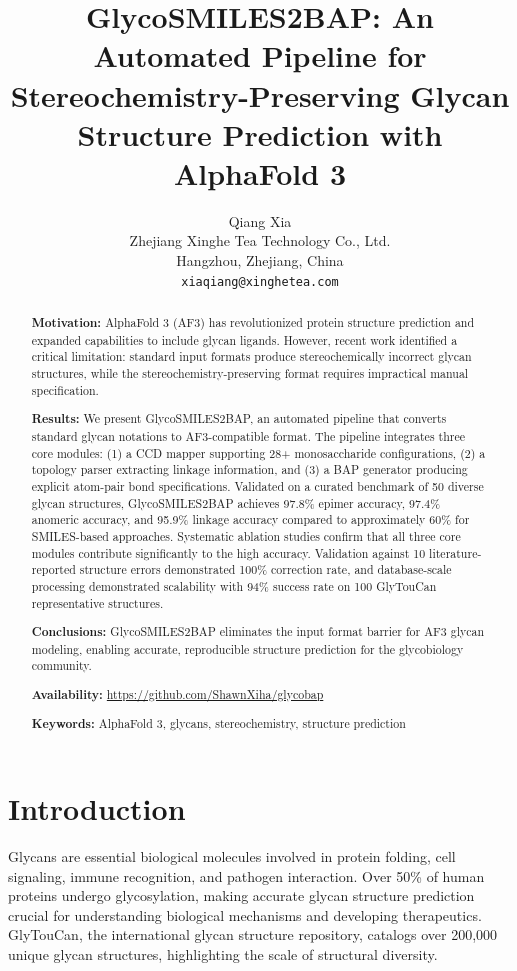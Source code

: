 \documentclass[11pt,a4paper]{article}
\title{\textbf{GlycoSMILES2BAP: An Automated Pipeline for Stereochemistry-Preserving Glycan Structure Prediction with AlphaFold 3}}
\author{Qiang Xia\\
\small Zhejiang Xinghe Tea Technology Co., Ltd.\\
\small Hangzhou, Zhejiang, China\\
\small \texttt{xiaqiang@xinghetea.com}}
\date{}
\begin{document}
\maketitle

\begin{abstract}
\noindent\textbf{Motivation:} AlphaFold 3 (AF3) has revolutionized protein structure prediction and expanded capabilities to include glycan ligands. However, recent work identified a critical limitation: standard input formats produce stereochemically incorrect glycan structures, while the stereochemistry-preserving format requires impractical manual specification.

\noindent\textbf{Results:} We present GlycoSMILES2BAP, an automated pipeline that converts standard glycan notations to AF3-compatible format. The pipeline integrates three core modules: (1) a CCD mapper supporting 28+ monosaccharide configurations, (2) a topology parser extracting linkage information, and (3) a BAP generator producing explicit atom-pair bond specifications. Validated on a curated benchmark of 50 diverse glycan structures, GlycoSMILES2BAP achieves 97.8\% epimer accuracy, 97.4\% anomeric accuracy, and 95.9\% linkage accuracy compared to approximately 60\% for SMILES-based approaches. Systematic ablation studies confirm that all three core modules contribute significantly to the high accuracy. Validation against 10 literature-reported structure errors demonstrated 100\% correction rate, and database-scale processing demonstrated scalability with 94\% success rate on 100 GlyTouCan representative structures.

\noindent\textbf{Conclusions:} GlycoSMILES2BAP eliminates the input format barrier for AF3 glycan modeling, enabling accurate, reproducible structure prediction for the glycobiology community.

\noindent\textbf{Availability:} \url{https://github.com/ShawnXiha/glycobap}

\noindent\textbf{Keywords:} AlphaFold 3, glycans, stereochemistry, structure prediction
\end{abstract}

\section{Introduction}

Glycans are essential biological molecules involved in protein folding, cell signaling, immune recognition, and pathogen interaction. Over 50\% of human proteins undergo glycosylation, making accurate glycan structure prediction crucial for understanding biological mechanisms and developing therapeutics. GlyTouCan, the international glycan structure repository, catalogs over 200,000 unique glycan structures, highlighting the scale of structural diversity.
\end{document}
